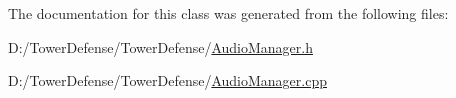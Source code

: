 The documentation for this class was generated from the following files\+:\begin{DoxyCompactItemize}
\item 
D\+:/\+Tower\+Defense/\+Tower\+Defense/\hyperlink{_audio_manager_8h}{Audio\+Manager.\+h}\item 
D\+:/\+Tower\+Defense/\+Tower\+Defense/\hyperlink{_audio_manager_8cpp}{Audio\+Manager.\+cpp}\end{DoxyCompactItemize}
